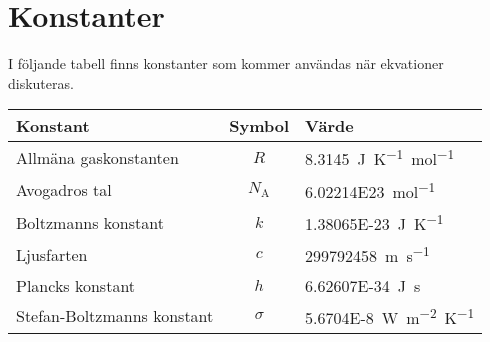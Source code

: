 \section{Konstanter}

I följande tabell finns konstanter som kommer användas när ekvationer diskuteras.

\begin{table}[!h]
	\centering
	\begin{tabular}{| l | c | l |}
		\hline
		\textbf{Konstant} & \multicolumn{1}{|l|}{\textbf{Symbol}} & \multicolumn{1}{|l|}{\textbf{Värde}} \\
		\hline
		Allmäna gaskonstanten           & $R$           & \SI{8.3145}{\joule~\kelvin^{-1}~\mol^{-1}} \\
		\hline
		Avogadros tal                   & $N_\text{A}$  & \SI{6.02214E23}{\mol^{-1}} \\
		\hline
		Boltzmanns konstant             & $k$           & \SI{1.38065E-23}{\joule~\kelvin^{-1}} \\
		\hline
		Ljusfarten                      & $c$           & \SI{299792458}{\meter~\second^{-1}} \\
		\hline
		Plancks konstant                & $h$           & \SI{6.62607E-34}{\joule~\second} \\
		\hline
		Stefan-Boltzmanns konstant      & $\sigma$      & \SI{5.6704E-8}{\watt~\meter^{-2}~\kelvin^{-1}} \\
		\hline
	\end{tabular}
\end{table}